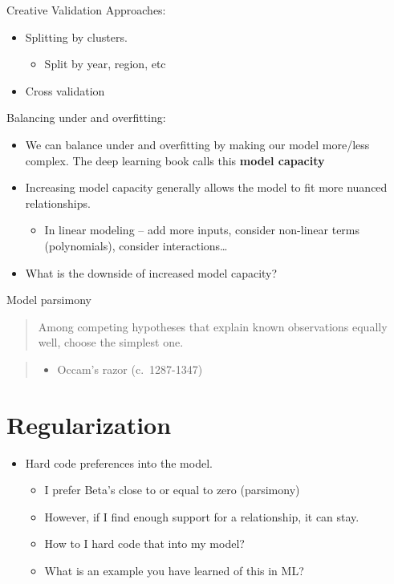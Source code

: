 \documentclass[fontset=fandol,zihao=false,scheme=chinese,heading=true,UTF8]{ctexbook}
\providecommand{\tightlist}{%
  \setlength{\itemsep}{0pt}\setlength{\parskip}{0pt}}
\begin{document}
Creative Validation Approaches:

\begin{itemize}
\tightlist
\item
  Splitting by clusters.

  \begin{itemize}
  \tightlist
  \item
    Split by year, region, etc
  \end{itemize}
\item
  Cross validation
\end{itemize}

Balancing under and overfitting:

\begin{itemize}
\tightlist
\item
  We can balance under and overfitting by making our model more/less complex. The deep learning book calls this \textbf{model capacity}
\item
  Increasing model capacity generally allows the model to fit more nuanced relationships.

  \begin{itemize}
  \tightlist
  \item
    In linear modeling -- add more inputs, consider non-linear terms (polynomials), consider interactions\ldots{}
  \end{itemize}
\item
  What is the downside of increased model capacity?
\end{itemize}

Model parsimony

\begin{quote}
Among competing hypotheses that explain known observations equally well, choose the simplest one.
\end{quote}

\begin{quote}
\begin{itemize}
\tightlist
\item
  Occam's razor (c.~1287-1347)
\end{itemize}
\end{quote}

\hypertarget{regularization}{%
\section{Regularization}\label{regularization}}

\begin{itemize}
\tightlist
\item
  Hard code preferences into the model.

  \begin{itemize}
  \tightlist
  \item
    I prefer Beta's close to or equal to zero (parsimony)
  \item
    However, if I find enough support for a relationship, it can stay.
  \item
    How to I hard code that into my model?
  \item
    What is an example you have learned of this in ML?
  \end{itemize}
\end{itemize}
\end{document}
